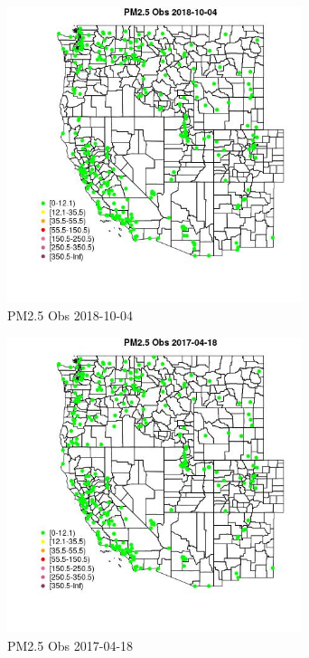 \begin{figure} 
\centering  
\includegraphics[width=0.77\textwidth]{Code_Outputs/Report_ML_input_PM25_Step4_part_f_de_duplicated_aveswNAs_MapObsPM25_Obs2018-10-04.jpg} 
\caption{\label{fig:Report_ML_input_PM25_Step4_part_f_de_duplicated_aveswNAsMapObsPM25_Obs2018-10-04}PM2.5 Obs 2018-10-04} 
\end{figure} 
 

\begin{figure} 
\centering  
\includegraphics[width=0.77\textwidth]{Code_Outputs/Report_ML_input_PM25_Step4_part_f_de_duplicated_aveswNAs_MapObsPM25_Obs2017-04-18.jpg} 
\caption{\label{fig:Report_ML_input_PM25_Step4_part_f_de_duplicated_aveswNAsMapObsPM25_Obs2017-04-18}PM2.5 Obs 2017-04-18} 
\end{figure} 
 

